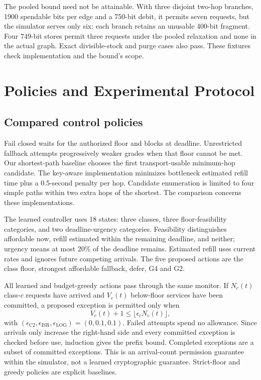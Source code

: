 \documentclass[conference,a4paper]{IEEEtran}
\begin{document}
The pooled bound need not be attainable. With three disjoint two-hop branches, 1900 spendable bits per edge and a 750-bit debit, it permits seven requests, but the simulator serves only six: each branch retains an unusable 400-bit fragment. Four 749-bit stores permit three requests under the pooled relaxation and none in the actual graph. Exact divisible-stock and purge cases also pass. These fixtures check implementation and the bound's scope.

\section{Policies and Experimental Protocol}\label{sec:protocol}
\subsection{Compared control policies}
Fail closed waits for the authorized floor and blocks at deadline. Unrestricted fallback attempts progressively weaker grades when that floor cannot be met. Our shortest-path baseline chooses the first transport-usable minimum-hop candidate. The key-aware implementation minimizes bottleneck estimated refill time plus a 0.5-second penalty per hop. Candidate enumeration is limited to four simple paths within two extra hops of the shortest. The comparison concerns these implementations.

The learned controller uses 18 states: three classes, three floor-feasibility categories, and two deadline-urgency categories. Feasibility distinguishes affordable now, refill estimated within the remaining deadline, and neither; urgency means at most 20\% of the deadline remains. Estimated refill uses current rates and ignores future competing arrivals. The five proposed actions are the class floor, strongest affordable fallback, defer, G4 and G2.

All learned and budget-greedy actions pass through the same monitor. If $N_c(t)$ class-$c$ requests have arrived and $V_c(t)$ below-floor services have been committed, a proposed exception is permitted only when
\begin{equation}\label{eq:budget}
V_c(t)+1\leq\lfloor\epsilon_cN_c(t)\rfloor,
\end{equation}
with $(\epsilon_{\mathrm{C2}},\epsilon_{\mathrm{ISR}},\epsilon_{\mathrm{LOG}})=(0,0.1,0.1)$. Failed attempts spend no allowance. Since arrivals only increase the right-hand side and every committed exception is checked before use, induction gives the prefix bound. Completed exceptions are a subset of committed exceptions. This is an arrival-count permission guarantee within the simulator, not a learned cryptographic guarantee. Strict-floor and greedy policies are explicit baselines.
\end{document}
